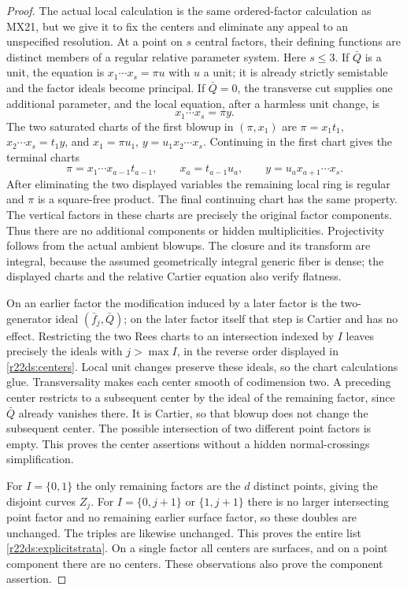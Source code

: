\begin{proof}
The actual local calculation is the same ordered-factor calculation
as MX21, but we give it to fix the centers and eliminate any appeal
to an unspecified resolution.  At a point on $s$ central factors,
their defining functions are distinct members of a regular relative
parameter system.  Here $s\le3$.  If $\bar Q$ is a unit, the equation
is $x_1\cdots x_s=\pi u$ with $u$ a unit; it is already strictly
semistable and the factor ideals become principal.  If $\bar Q=0$,
the transverse cut supplies one additional parameter, and the local
equation, after a harmless unit change, is
\[
                          x_1\cdots x_s=\pi y.
 \tag{DS22.6}\label{r22ds:local}
\]
The two saturated charts of the first blowup in $(\pi,x_1)$ are
$\pi=x_1t_1$, $x_2\cdots x_s=t_1y$, and
$x_1=\pi u_1$, $y=u_1x_2\cdots x_s$.  Continuing in the first
chart gives the terminal charts
\[
 \pi=x_1\cdots x_{a-1}t_{a-1},\qquad
 x_a=t_{a-1}u_a,\qquad y=u_ax_{a+1}\cdots x_s.
 \tag{DS22.7}\label{r22ds:charts}
\]
After eliminating the two displayed variables the remaining local
ring is regular and $\pi$ is a square-free product.  The final
continuing chart has the same property.  The vertical factors in
these charts are precisely the original factor components.  Thus
there are no additional components or hidden multiplicities.
Projectivity follows from the actual ambient blowups.  The closure
and its transform are integral, because the assumed geometrically
integral generic fiber is dense; the displayed charts and the
relative Cartier equation also verify flatness.

On an earlier factor the modification induced by a later factor is
the two-generator ideal $(\bar f_j,\bar Q)$; on the later factor
itself that step is Cartier and has no effect.  Restricting the two
Rees charts to an intersection indexed by $I$ leaves precisely the
ideals with $j>\max I$, in the reverse order displayed in
\eqref{r22ds:centers}.  Local unit changes preserve these ideals,
so the chart calculations glue.  Transversality makes each center
smooth of codimension two.  A preceding center restricts to a
subsequent center by the ideal of the remaining factor, since
$\bar Q$ already vanishes there.  It is Cartier, so that blowup
does not change the subsequent center.  The possible intersection
of two different point factors is empty.  This proves the center
assertions without a hidden normal-crossings simplification.

For $I=\{0,1\}$ the only remaining factors are the $d$ distinct
points, giving the disjoint curves $Z_j$.  For $I=\{0,j+1\}$ or
$\{1,j+1\}$ there is no larger intersecting point factor and no
remaining earlier surface factor, so these doubles are unchanged.
The triples are likewise unchanged.  This proves the entire list
\eqref{r22ds:explicitstrata}.  On a single factor all centers are
surfaces, and on a point component there are no centers.  These
observations also prove the component assertion.
\end{proof}

